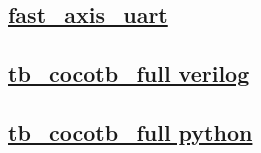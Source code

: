 \documentclass{article}
\begin{document}
  


  \subsection{\href{../files/fast_axis_uart-v.html}{fast\_axis\_uart}}

  \subsection{\href{../files2/tb_cocotb_full-v.html}{tb\_cocotb\_full verilog}}

  \subsection{\href{../files2/tb_cocotb_full-py.html}{tb\_cocotb\_full python}}
\end{document}
